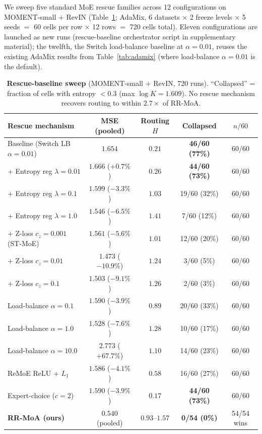 \documentclass{article}
\begin{document}
We sweep five standard MoE rescue families across 12 configurations on MOMENT-small $+$ RevIN (Table~\ref{tab:rescue}; AdaMix, 6 datasets $\times$ 2 freeze levels $\times$ 5 seeds $=$ 60 cells per row $\times$ 12 rows $=$ 720 cells total). Eleven configurations are launched as new runs (rescue-baseline orchestrator script in supplementary material); the twelfth, the Switch load-balance baseline at $\alpha{=}0.01$, reuses the existing AdaMix results from Table~\ref{tab:adamix} (where load-balance $\alpha{=}0.01$ is the default).

\begin{table}[!htbp]
\centering
\caption{\textbf{Rescue-baseline sweep} (MOMENT-small $+$ RevIN, 720 runs). ``Collapsed'' = fraction of cells with entropy $<0.3$ (max $\log K{=}1.609$). No rescue mechanism recovers routing to within $2.7\times$ of RR-MoA.}
\label{tab:rescue}
\footnotesize
\begin{tabular}{@{}lcccc@{}}
\toprule
Rescue mechanism & MSE (pooled) & Routing $H$ & Collapsed & $n/60$ \\
\midrule
Baseline (Switch LB $\alpha{=}0.01$)  & $1.654$ & $0.21$ & \textbf{46/60 (77\%)} & 60/60 \\
+ Entropy reg $\lambda{=}0.01$                       & $1.666$ ($+0.7\%$)  & $0.26$ & \textbf{44/60 (73\%)} & 60/60 \\
+ Entropy reg $\lambda{=}0.1$                        & $1.599$ ($-3.3\%$)  & $1.03$ & 19/60 (32\%) & 60/60 \\
+ Entropy reg $\lambda{=}1.0$                        & $1.546$ ($-6.5\%$) & $1.41$ & 7/60 (12\%) & 60/60 \\
+ Z-loss $c_z{=}0.001$ (ST-MoE)                      & $1.561$ ($-5.6\%$)  & $1.01$ & 12/60 (20\%) & 60/60 \\
+ Z-loss $c_z{=}0.01$                                & $\mathbf{1.473}$ ($\mathbf{-10.9\%}$) & $1.24$ & 3/60 (5\%) & 60/60 \\
+ Z-loss $c_z{=}0.1$                                 & $1.503$ ($-9.1\%$) & $1.26$ & 2/60 (3\%) & 60/60 \\
Load-balance $\alpha{=}0.1$                          & $1.590$ ($-3.9\%$) & $0.89$ & 20/60 (33\%) & 60/60 \\
Load-balance $\alpha{=}1.0$                          & $1.528$ ($-7.6\%$) & $1.28$ & 10/60 (17\%) & 60/60 \\
Load-balance $\alpha{=}10.0$                         & $2.773$ ($+67.7\%$) & $1.10$ & 14/60 (23\%) & 60/60 \\
ReMoE ReLU $+$ $L_1$                  & $1.586$ ($-4.1\%$) & $0.58$ & 16/60 (27\%) & 60/60 \\
Expert-choice ($c{=}2$)                      & $1.590$ ($-3.9\%$) & $0.17$ & \textbf{44/60 (73\%)} & 60/60 \\
\midrule
\textbf{RR-MoA (ours)} & $\mathbf{0.540}$ (pooled) & $\mathbf{0.93\text{--}1.57}$ & \textbf{0/54 (0\%)} & 54/54 wins \\
\bottomrule
\end{tabular}
\end{table}
\end{document}
